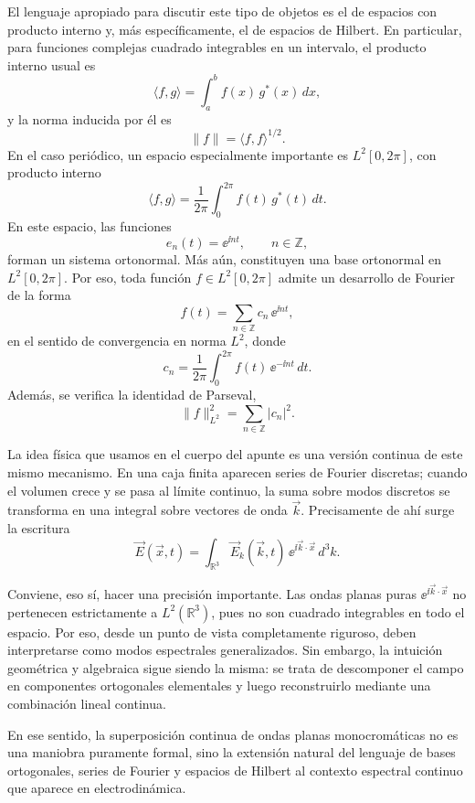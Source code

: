 \documentclass[../main.tex]{subfiles}
\begin{document}
El lenguaje apropiado para discutir este tipo de objetos es el de espacios con producto interno y, más específicamente, el de espacios de Hilbert. En particular, para funciones complejas cuadrado integrables en un intervalo, el producto interno usual es
\begin{equation*}
    \langle f,g\rangle=\int_a^b f(x)\,g^*(x)\,dx,
\end{equation*}
y la norma inducida por él es
\begin{equation*}
    \|f\|=\langle f,f\rangle^{1/2}.
\end{equation*}
En el caso periódico, un espacio especialmente importante es $L^2[0,2\pi]$, con producto interno
\begin{equation*}
    \langle f,g\rangle=\frac{1}{2\pi}\int_0^{2\pi} f(t)\,g^*(t)\,dt.
\end{equation*}
En este espacio, las funciones
\begin{equation*}
    e_n(t)=\ee^{\ii nt},\qquad n\in\mathbb Z,
\end{equation*}
forman un sistema ortonormal. Más aún, constituyen una base ortonormal en $L^2[0,2\pi]$. Por eso, toda función $f\in L^2[0,2\pi]$ admite un desarrollo de Fourier de la forma
\begin{equation*}
    f(t)=\sum_{n\in\mathbb Z} c_n\,\ee^{\ii nt},
\end{equation*}
en el sentido de convergencia en norma $L^2$, donde
\begin{equation*}
    c_n=\frac{1}{2\pi}\int_0^{2\pi} f(t)\,\ee^{-\ii nt}\,dt.
\end{equation*}
Además, se verifica la identidad de Parseval,
\begin{equation*}
    \|f\|_{L^2}^2=\sum_{n\in\mathbb Z}|c_n|^2.
\end{equation*}

La idea física que usamos en el cuerpo del apunte es una versión continua de este mismo mecanismo. En una caja finita aparecen series de Fourier discretas; cuando el volumen crece y se pasa al límite continuo, la suma sobre modos discretos se transforma en una integral sobre vectores de onda $\vec k$. Precisamente de ahí surge la escritura
\begin{equation*}
    \vec E(\vec x,t)=\int_{\mathbb R^3}\vec E_k(\vec k,t)\,\ee^{\ii\vec k\cdot\vec x}\,d^3k.
\end{equation*}

Conviene, eso sí, hacer una precisión importante. Las ondas planas puras $\ee^{\ii\vec k\cdot\vec x}$ no pertenecen estrictamente a $L^2(\mathbb R^3)$, pues no son cuadrado integrables en todo el espacio. Por eso, desde un punto de vista completamente riguroso, deben interpretarse como modos espectrales generalizados. Sin embargo, la intuición geométrica y algebraica sigue siendo la misma: se trata de descomponer el campo en componentes ortogonales elementales y luego reconstruirlo mediante una combinación lineal continua.

En ese sentido, la superposición continua de ondas planas monocromáticas no es una maniobra puramente formal, sino la extensión natural del lenguaje de bases ortogonales, series de Fourier y espacios de Hilbert al contexto espectral continuo que aparece en electrodinámica.
\end{document}

